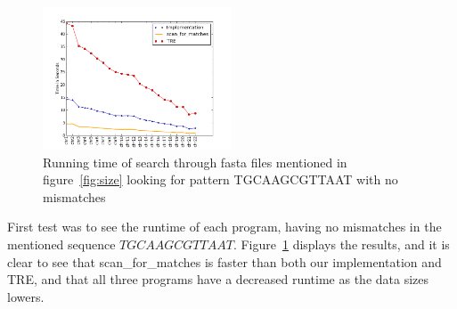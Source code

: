 \begin{figure}[h!]
\centering
\includegraphics[width=0.5\textwidth]{Benchmarking/0miss.png}
\caption{Running time of search through fasta files mentioned in figure~\ref{fig:size} looking for pattern TGCAAGCGTTAAT with no mismatches}
\label{fig:0miss}
\end{figure}

First test was to see the runtime of each program, having no mismatches in the mentioned sequence $TGCAAGCGTTAAT$. Figure~\ref{fig:0miss} displays the results, and it is clear to see that scan\_for\_matches is faster than both our implementation and TRE, and that all three programs have a decreased runtime as the data sizes lowers.

